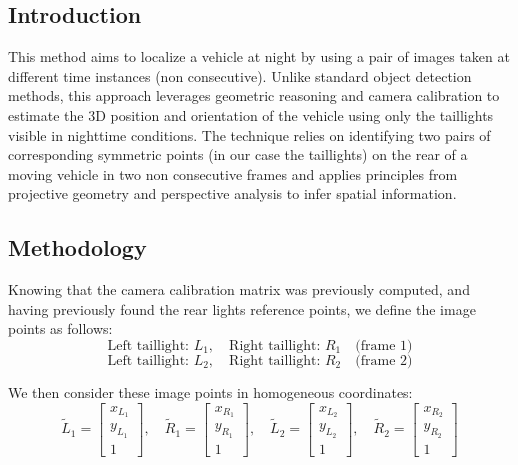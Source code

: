 \subsection{Introduction}
This method aims to localize a vehicle at night by using a pair of images taken at different time instances (non consecutive). Unlike standard object detection methods, this approach leverages geometric reasoning and camera calibration to estimate the 3D position and orientation of the vehicle using only the taillights visible in nighttime conditions. The technique relies on identifying two pairs of corresponding symmetric points (in our case the taillights) on the rear of a moving vehicle in two non consecutive frames and applies principles from projective geometry and perspective analysis to infer spatial information.

\subsection{Methodology}

Knowing that the camera calibration matrix was previously computed, and having previously found the rear lights reference points, we define the image points as follows:
\[
\text{Left taillight: } L_1, \quad \text{Right taillight: } R_1 \quad \text{(frame 1)}
\]
\[
\text{Left taillight: } L_2, \quad \text{Right taillight: } R_2 \quad \text{(frame 2)}
\]

We then consider these image points in homogeneous coordinates:
\[
\tilde{L}_1 = \begin{bmatrix} x_{L_1} \\ y_{L_1} \\ 1 \end{bmatrix}, \quad \tilde{R}_1 = \begin{bmatrix} x_{R_1} \\ y_{R_1} \\ 1 \end{bmatrix}, \quad \tilde{L}_2 = \begin{bmatrix} x_{L_2} \\ y_{L_2} \\ 1 \end{bmatrix}, \quad \tilde{R}_2 = \begin{bmatrix} x_{R_2} \\ y_{R_2} \\ 1 \end{bmatrix}
\]

